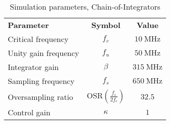 
\begin{table}[htbp]
  \centering
  \caption{Simulation parameters, Chain-of-Integrators}
    \begin{tabular}{lcc}
    \rowcolor[rgb]{ 0,  0,  0} \textcolor[rgb]{ 1,  1,  1}{\textbf{Parameter}}	 & \textcolor[rgb]{ 1,  1,  1}{\textbf{Symbol}}
                             & \textcolor[rgb]{ 1,  1,  1}{\textbf{Value}}              \\
    Critical frequency       & $f_c$            & $\SI{10}{\mega\hertz}$                  \\
    Unity gain frequency     & $f_u$            & $\SI{50}{\mega\hertz}$               \\
    Integrator gain          & $\beta$          & $\SI{315}{\mega\hertz}$               \\
    Sampling frequency       & $f_s$            & $\SI{650}{\mega\hertz}$                 \\
    Oversampling ratio       & $\text{OSR} \left( \frac{f_s}{2f_c} \right)$ & $32.5$     \\
    Control gain             & $\kappa$          & $1$
    \end{tabular}
  \label{tab:CI_params}
\end{table}


